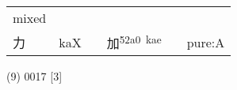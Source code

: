 \documentclass[14pt,a4paper]{scrartcl}
\begin{document}
\begin{longtable}[c]{@{}llllll@{}}
\begin{minipage}[t]{0.14\columnwidth}
mixed
\strut\end{minipage}\tabularnewline
\begin{minipage}[t]{0.14\columnwidth}\raggedright\strut
力
\strut\end{minipage} &
\begin{minipage}[t]{0.14\columnwidth}\raggedright\strut
kaX
\strut\end{minipage} &
\begin{minipage}[t]{0.14\columnwidth}\raggedright\strut
\strut\end{minipage} &
\begin{minipage}[t]{0.14\columnwidth}\raggedright\strut
加\textsuperscript{52a0~kae}
\strut\end{minipage} &
\begin{minipage}[t]{0.14\columnwidth}\raggedright\strut
\strut\end{minipage} &
\begin{minipage}[t]{0.14\columnwidth}\raggedright\strut
pure:A
\strut\end{minipage}\tabularnewline
\bottomrule
\end{longtable}

(9) 0017 {[}3{]}
\end{document}
